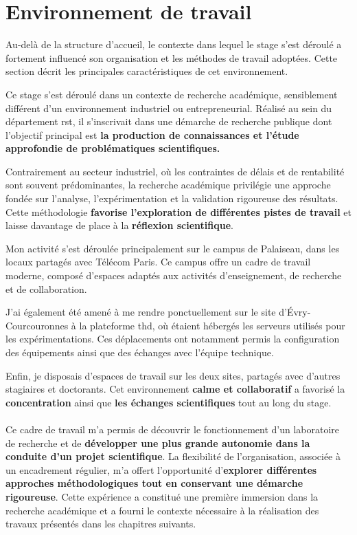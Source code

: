 \documentclass[12pt, a4paper]{report}
\begin{document}
	\section{Environnement de travail}

	Au-delà de la structure d'accueil, le contexte dans lequel le stage s'est déroulé a fortement influencé son organisation et les méthodes de travail adoptées. Cette section décrit les principales caractéristiques de cet environnement.

	Ce stage s'est déroulé dans un contexte de recherche académique, sensiblement différent d'un environnement industriel ou entrepreneurial. Réalisé au sein du département \gls{rst}, il s'inscrivait dans une démarche de recherche publique dont l'objectif principal est \textbf{la production de connaissances et l'étude approfondie de problématiques scientifiques.}

	Contrairement au secteur industriel, où les contraintes de délais et de rentabilité sont souvent prédominantes, la recherche académique privilégie une approche fondée sur l'analyse, l'expérimentation et la validation rigoureuse des résultats. Cette méthodologie \textbf{favorise l'exploration de différentes pistes de travail} et laisse davantage de place à la \textbf{réflexion scientifique}.

	Mon activité s'est déroulée principalement sur le campus de Palaiseau, dans les locaux partagés avec Télécom Paris. Ce campus offre un cadre de travail moderne, composé d'espaces adaptés aux activités d'enseignement, de recherche et de collaboration.

	J'ai également été amené à me rendre ponctuellement sur le site d'Évry-Courcouronnes à la plateforme \gls{thd}, où étaient hébergés les serveurs utilisés pour les expérimentations. Ces déplacements ont notamment permis la configuration des équipements ainsi que des échanges avec l'équipe technique.

	Enfin, je disposais d'espaces de travail sur les deux sites, partagés avec d'autres stagiaires et doctorants. Cet environnement \textbf{calme et collaboratif} a favorisé la \textbf{concentration} ainsi que \textbf{les échanges scientifiques} tout au long du stage.

	\paragraph{}

	Ce cadre de travail m'a permis de découvrir le fonctionnement d'un laboratoire de recherche et de \textbf{développer une plus grande autonomie dans la conduite d'un projet scientifique}. La flexibilité de l'organisation, associée à un encadrement régulier, m'a offert l'opportunité d'\textbf{explorer différentes approches méthodologiques tout en conservant une démarche rigoureuse}. Cette expérience a constitué une première immersion dans la recherche académique et a fourni le contexte nécessaire à la réalisation des travaux présentés dans les chapitres suivants.
\end{document}
